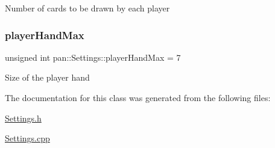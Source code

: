 Number of cards to be drawn by each player \mbox{\label{classpan_1_1_settings_a189fdd9a58dc25ca3f8766be031eba99}} 
\subsubsection{\texorpdfstring{player\+Hand\+Max}{playerHandMax}}
{\footnotesize\ttfamily unsigned int pan\+::\+Settings\+::player\+Hand\+Max = 7}

Size of the player hand 

The documentation for this class was generated from the following files\+:\begin{DoxyCompactItemize}
\item 
\hyperlink{_settings_8h}{Settings.\+h}\item 
\hyperlink{_settings_8cpp}{Settings.\+cpp}\end{DoxyCompactItemize}
